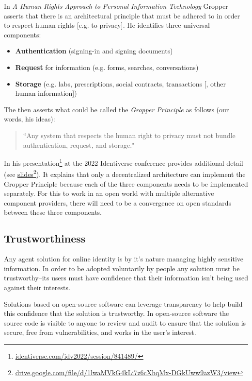\documentclass[11pt, oneside]{article}   	%
\newcommand{\hyperfootnote}[1][]{\def\ArgI{{#1}}\hyperfootnoteRelay}
\newcommand\hyperfootnoteRelay[2][]{\href{#1#2}{\ArgI}\footnote{\href{#1#2}{#2}}}
\begin{document}
In \emph{A Human Rights Approach to Personal Information Technology}\cite{Gropper2022} Gropper asserts that there is an architectural principle that must be adhered to in order to respect human rights [e.g. to privacy]. He identifies three universal components:

\begin{itemize}
\item \textbf{Authentication} (signing-in and signing documents)
\item \textbf{Request} for information (e.g. forms, searches, conversations)
\item \textbf{Storage} (e.g. labs, prescriptions, social contracts, transactions [, other human information])
\end{itemize}

The then asserts what could be called the \emph{Gropper Principle} as follows (our words, his ideas):
\begin{quote}
``Any system that respects the human right to privacy must not bundle authentication, request, and storage."
\end{quote}

In his presentation\hyperfootnote[][https://]{identiverse.com/idv2022/session/841489/} at the 2022 Identiverse conference provides additional detail (see \hyperfootnote[slides][https://]{drive.google.com/file/d/1lwaMVkG4kLi7z6cXhqMx-DGkUww9azW3/view}). It explains that only a decentralized architecture can implement the Gropper Principle because each of the three components needs to be implemented separately. For this to work in an open world with multiple alternative component providers, there will need to be a convergence on open standards between these three components. 

\subsection{Trustworthiness}

Any agent solution for online identity is by it's nature managing highly sensitive information. In order to be adopted voluntarily by people any solution must be trustworthy--its users must have confidence that their information isn't being used against their interests. 

Solutions based on open-source software can leverage transparency to help build this confidence that the solution is trustworthy. In open-source software the source code is visible to anyone to review and audit to ensure that the solution is secure, free from vulnerabilities, and works in the user's interest.
\end{document}
